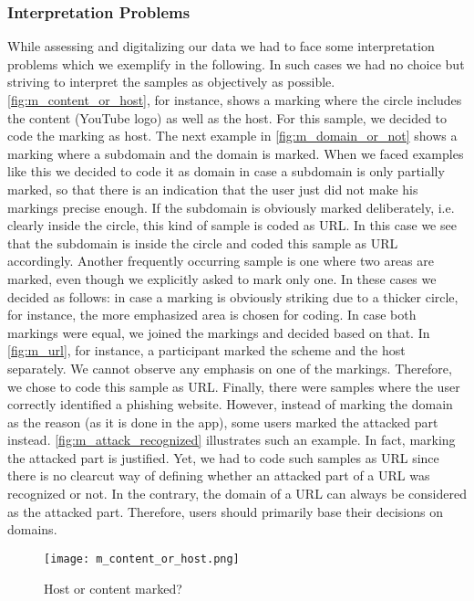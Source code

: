 \subsubsection{Interpretation Problems}
\label{s:intprobs}
While assessing and digitalizing our data we had to face some interpretation problems which we exemplify in the following.
In such cases we had no choice but striving to interpret the samples as objectively as possible.
\autoref{fig:m_content_or_host}, for instance, shows a marking where the circle includes the content (YouTube logo) as well as the host. 
For this sample, we decided to code the marking as host.
The next example in \autoref{fig:m_domain_or_not} shows a marking where a subdomain and the domain is marked. 
When we faced examples like this we decided to code it as domain in case a subdomain is only partially marked, so that there is an indication that the user just did not make his markings precise enough.
If the subdomain is obviously marked deliberately, i.e. clearly inside the circle, this kind of sample is coded as URL.
In this case we see that the subdomain is inside the circle and coded this sample as URL accordingly.
Another frequently occurring sample is one where two areas are marked, even though we explicitly asked to mark only one.
In these cases we decided as follows: in case a marking is obviously striking due to a thicker circle, for instance, the more emphasized area is chosen for coding.
In case both markings were equal, we joined the markings and decided based on that.
In \autoref{fig:m_url}, for instance, a participant marked the scheme and the host separately. 
We cannot observe any emphasis on one of the markings.
Therefore, we chose to code this sample as URL.
Finally, there were samples where the user correctly identified a phishing website.
However, instead of marking the domain as the reason (as it is done in the app), some users marked the attacked part instead.
\autoref{fig:m_attack_recognized} illustrates such an example.
In fact, marking the attacked part is justified. 
Yet, we had to code such samples as URL since there is no clearcut way of defining whether an attacked part of a URL was recognized or not.
In the contrary, the domain of a URL can always be considered as the attacked part. Therefore, users should primarily base their decisions on domains.

\begin{figure}[H]
\centering
\texttt{[image: m\_content\_or\_host.png]}
\caption{Host or content marked?}
\label{fig:m_content_or_host}
\end{figure}

